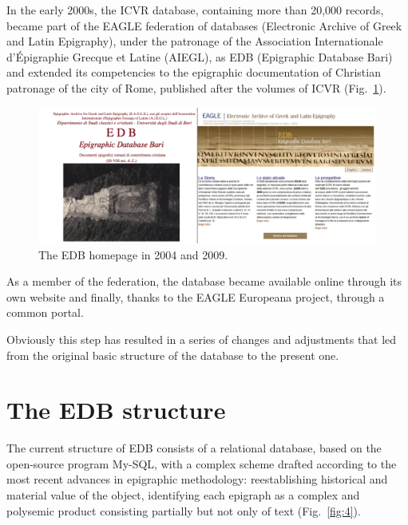\documentclass[amsthm,ebook]{saparticle}
\begin{document}
In the early 2000s, the ICVR database, containing more than 20,000 records, became part of the EAGLE federation of
databases (Electronic Archive of Greek and Latin Epigraphy), under the patronage of the Association Internationale
d’Épigraphie Grecque et Latine (AIEGL), as EDB (Epigraphic Database Bari) and extended its competencies to the
epigraphic documentation of Christian patronage of the city of Rome, published after the volumes of ICVR (Fig.~\ref{fig:3}). 

\begin{figure}[hbp]
\centering
 \includegraphics[width=\columnwidth]{EAGLE2016Roccoengrev-img003.png} 
\caption{The EDB homepage in 2004 and 2009.}
\label{fig:3}
\end{figure}



As a member of the federation, the database became available online through its own website and finally, thanks to the
EAGLE Europeana project, through a common portal.

\newpage
Obviously this step has resulted in a series of changes and adjustments that led from the original basic structure of
the database to the present one. 

\section{The EDB structure}


The current structure of EDB consists of a relational database, based on the open-source program My-SQL, with a complex
scheme drafted according to the most recent advances in epigraphic methodology: reestablishing historical and material
value of the object, identifying each epigraph as a complex and polysemic product consisting partially but not only of
text (Fig.~\ref{fig:4}).
\end{document}
